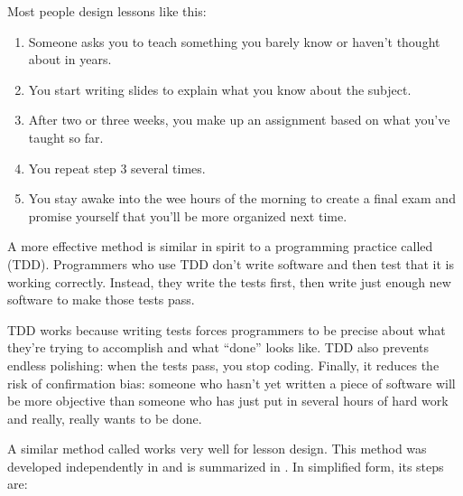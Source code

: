 
Most people design lessons like this:

\begin{enumerate}

\item
  Someone asks you to teach something you barely know
  or haven't thought about in years.

\item
  You start writing slides to explain what you know about the subject.

\item
  After two or three weeks,
  you make up an assignment based on what you've taught so far.

\item
  You repeat step 3 several times.

\item
  You stay awake into the wee hours of the morning
  to create a final exam
  and promise yourself that you'll be more organized next time.

\end{enumerate}

A more effective method is similar in spirit to a programming practice called
 (TDD).
Programmers who use TDD don't write software
and then test that it is working correctly.
Instead,
they write the tests first,
then write just enough new software to make those tests pass.

TDD works because writing tests forces programmers to be precise about
what they're trying to accomplish and what ``done'' looks like.
TDD also prevents endless polishing:
when the tests pass, you stop coding.
Finally,
it reduces the risk of confirmation bias:
someone who hasn't yet written a piece of software
will be more objective than someone who has just put in several hours of hard work
and really, really wants to be done.

A similar method called  works very well for lesson design.
This method was developed independently in \cite{Wigg2005,Bigg2011,Fink2013}
and is summarized in \cite{McTi2013}.
In simplified form, its steps are:

